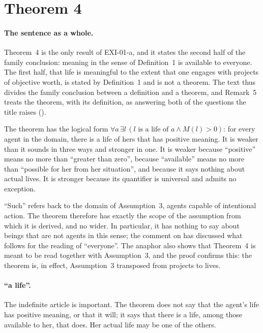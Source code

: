 \section{Theorem 4}\label{s:thm}


\paragraph{The sentence as a whole.} Theorem~4 is the only result of EXI-01-a, and it states the second half of the family conclusion: meaning in the sense of Definition~1 is available to everyone. The first half, that life is meaningful to the extent that one engages with projects of objective worth, is stated by Definition~1 and is not a theorem. The text thus divides the family conclusion between a definition and a theorem, and Remark~5 treats the theorem, with its definition, as answering both of the questions the title raises ().

The theorem has the logical form $\forall a\,\exists l\,(l \text{ is a life of } a \wedge M(l) > 0)$: for every agent in the domain, there is a life of hers that has positive meaning. It is weaker than it sounds in three ways and stronger in one. It is weaker because \enquote{positive} means no more than \enquote{greater than zero}, because \enquote{available} means no more than \enquote{possible for her from her situation}, and because it says nothing about actual lives. It is stronger because its quantifier is universal and admits no exception.


\enquote{Such} refers back to the domain of Assumption~3, agents capable of intentional action. The theorem therefore has exactly the scope of the assumption from which it is derived, and no wider. In particular, it has nothing to say about beings that are not agents in this sense; the comment on  has discussed what follows for the reading of \enquote{everyone}. The anaphor also shows that Theorem~4 is meant to be read together with Assumption~3, and the proof confirms this: the theorem is, in effect, Assumption~3 transposed from projects to lives.


\paragraph{\enquote{a life}.} The indefinite article is important. The theorem does not say that the agent's life has positive meaning, or that it will; it says that there is a life, among those available to her, that does. Her actual life may be one of the others.

